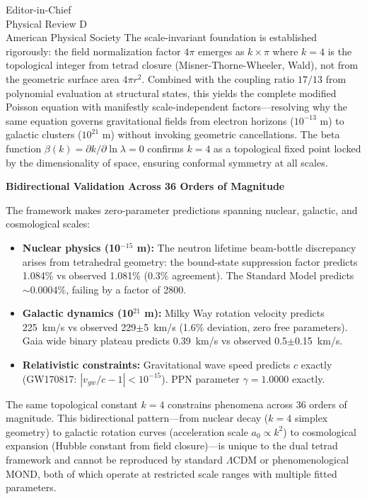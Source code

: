 \documentclass[11pt]{letter}
\begin{document}
\begin{letter}{%
Editor-in-Chief\\
Physical Review D\\
American Physical Society
}
The scale-invariant foundation is established rigorously: the field normalization factor $4\pi$ emerges as $k \times \pi$ where $k=4$ is the topological integer from tetrad closure (Misner-Thorne-Wheeler, Wald), not from the geometric surface area $4\pi r^2$. Combined with the coupling ratio $17/13$ from polynomial evaluation at structural states, this yields the complete modified Poisson equation with manifestly scale-independent factors---resolving why the same equation governs gravitational fields from electron horizons ($10^{-13}$ m) to galactic clusters ($10^{21}$ m) without invoking geometric cancellations. The beta function $\beta(k) = \partial k/\partial \ln \lambda = 0$ confirms $k=4$ as a topological fixed point locked by the dimensionality of space, ensuring conformal symmetry at all scales.

\textbf{Bidirectional Validation Across 36 Orders of Magnitude}

The framework makes zero-parameter predictions spanning nuclear, galactic, and cosmological scales:

\begin{itemize}
\item \textbf{Nuclear physics (10$^{-15}$ m):} The neutron lifetime beam-bottle discrepancy arises from tetrahedral geometry: the bound-state suppression factor predicts 1.084\% vs observed 1.081\% (0.3\% agreement). The Standard Model predicts $\sim$0.0004\%, failing by a factor of 2800.

\item \textbf{Galactic dynamics (10$^{21}$ m):} Milky Way rotation velocity predicts 225~km/s vs observed 229$\pm$5~km/s (1.6\% deviation, zero free parameters). Gaia wide binary plateau predicts 0.39~km/s vs observed 0.5$\pm$0.15~km/s.

\item \textbf{Relativistic constraints:} Gravitational wave speed predicts $c$ exactly (GW170817: $|v_{gw}/c - 1| < 10^{-15}$). PPN parameter $\gamma = 1.0000$ exactly.
\end{itemize}

The same topological constant $k = 4$ constrains phenomena across 36 orders of magnitude. This bidirectional pattern---from nuclear decay ($k = 4$ simplex geometry) to galactic rotation curves (acceleration scale $a_0 \propto k^2$) to cosmological expansion (Hubble constant from field closure)---is unique to the dual tetrad framework and cannot be reproduced by standard $\Lambda$CDM or phenomenological MOND, both of which operate at restricted scale ranges with multiple fitted parameters.


\end{letter}
\end{document}

